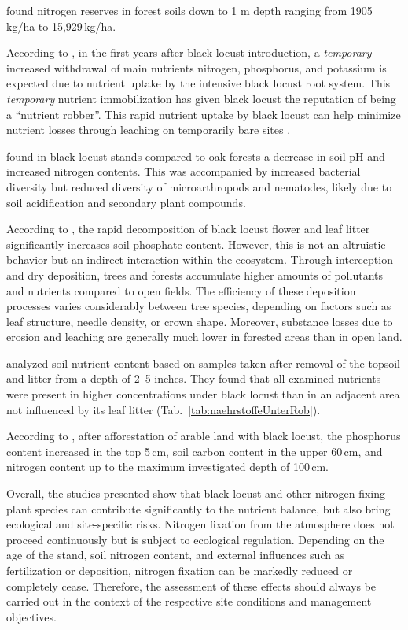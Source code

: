 \citet{emberger1965stickstoff} found nitrogen reserves in forest soils down to 1 m depth ranging from 1905\,kg/ha to 15,929\,kg/ha.

According to \citet{mueller1991robinie}, in the first years after black locust introduction, a \emph{temporary} increased withdrawal of main nutrients nitrogen, phosphorus, and potassium is expected due to nutrient uptake by the intensive black locust root system. This \emph{temporary} nutrient immobilization has given black locust the reputation of being a \enquote{nutrient robber}.
This rapid nutrient uptake by black locust can help minimize nutrient losses through leaching on temporarily bare sites \citep{boring1984robinie}.

\citet{lazzaro2018robinie} found in black locust stands compared to oak forests a decrease in soil pH and increased nitrogen contents. This was accompanied by increased bacterial diversity but reduced diversity of microarthropods and nematodes, likely due to soil acidification and secondary plant compounds.

According to \citet{lee2010robinie}, the rapid decomposition of black locust flower and leaf litter significantly increases soil phosphate content. However, this is not an altruistic behavior but an indirect interaction within the ecosystem. Through interception and dry deposition, trees and forests accumulate higher amounts of pollutants and nutrients compared to open fields. The efficiency of these deposition processes varies considerably between tree species, depending on factors such as leaf structure, needle density, or crown shape. Moreover, substance losses due to erosion and leaching are generally much lower in forested areas than in open land.

\citet{garman1938robinie} analyzed soil nutrient content based on samples taken after removal of the topsoil and litter from a depth of 2–5 inches. They found that all examined nutrients were present in higher concentrations under black locust than in an adjacent area not influenced by its leaf litter (Tab.~\ref{tab:naehrstoffeUnterRob}).


According to \citet{kou2016robinieBoden}, after afforestation of arable land with black locust, the phosphorus content increased in the top 5\,cm, soil carbon content in the upper 60\,cm, and nitrogen content up to the maximum investigated depth of 100\,cm.

Overall, the studies presented show that black locust and other nitrogen-fixing plant species can contribute significantly to the nutrient balance, but also bring ecological and site-specific risks. Nitrogen fixation from the atmosphere does not proceed continuously but is subject to ecological regulation. Depending on the age of the stand, soil nitrogen content, and external influences such as fertilization or deposition, nitrogen fixation can be markedly reduced or completely cease. Therefore, the assessment of these effects should always be carried out in the context of the respective site conditions and management objectives.


